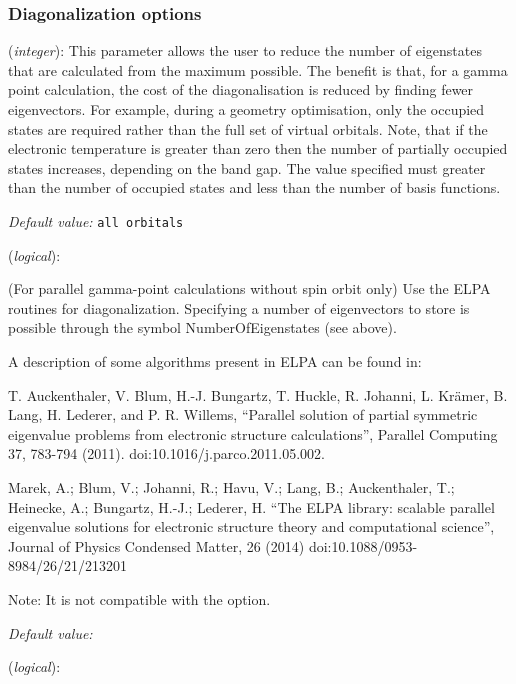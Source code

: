 \subsubsection{Diagonalization options}
\begin{description}
\itemsep 10pt
\parsep 0pt
\item[\textbf{NumberOfEigenStates}] (\textit{integer}):
This parameter allows the user to reduce the number of eigenstates
that are calculated from the maximum possible. The benefit is that,
for a gamma point calculation, the cost of the diagonalisation is
reduced by finding fewer eigenvectors. For example, during a geometry
optimisation, only the occupied states are required rather than the
full set of virtual orbitals. Note, that if the electronic temperature
is greater than zero then the number of partially occupied states
increases, depending on the band gap.
The value specified must greater than the number of occupied states
and less than the number of basis functions.

\textit{Default value:} \texttt{all orbitals}

\item[\fdf{Diag!ELPA}] (\textit{logical}):

(For parallel gamma-point calculations without spin orbit only)
Use the ELPA routines for diagonalization.
Specifying a number of eigenvectors to store is possible through
the symbol NumberOfEigenstates (see above).

A description of some algorithms present in ELPA can be found in:

T. Auckenthaler, V. Blum, H.-J. Bungartz, T. Huckle, R. Johanni,
L. Kr\"amer, B. Lang, H. Lederer, and P. R. Willems,
``Parallel solution of partial symmetric eigenvalue problems from
electronic structure calculations'',
Parallel Computing 37, 783-794 (2011).
doi:10.1016/j.parco.2011.05.002.

Marek, A.; Blum, V.; Johanni, R.; Havu, V.; Lang, B.; Auckenthaler,
T.; Heinecke, A.; Bungartz, H.-J.; Lederer, H.
  ``The ELPA library: scalable parallel eigenvalue solutions for
electronic
structure theory and computational science'',
Journal of Physics Condensed Matter, 26 (2014)
doi:10.1088/0953-8984/26/21/213201

Note: It is not compatible with the  option.

\textit{Default value:} \fdffalse

\item[\fdf{Diag!MRRR}] (\textit{logical}):


\end{description}
